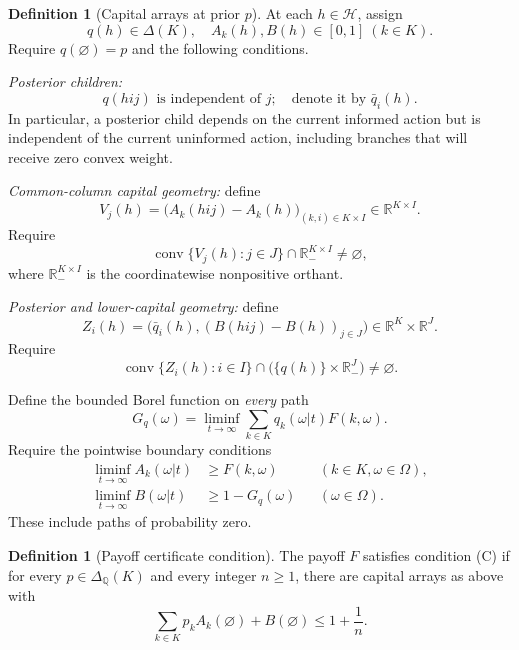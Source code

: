 \documentclass[11pt,a4paper]{article}
\theoremstyle{definition}
\newtheorem{definition}[theorem]{Definition}
\theoremstyle{remark}
\newcommand{\R}{\mathbb R}
\newcommand{\HH}{\mathcal H}
\newcommand{\co}{\operatorname{conv}}
\begin{document}
\begin{definition}[Capital arrays at prior $p$]
At each $h\in\HH$, assign
\[
 q(h)\in\Delta(K),\quad
 A_k(h),B(h)\in[0,1]\ (k\in K).
\]
Require $q(\varnothing)=p$ and the following conditions.

\emph{Posterior children:}
\begin{equation}
 q(hij)\text{ is independent of }j;
 \quad\text{denote it by }\bar q_i(h).
 \tag{BF}\label{bf}
\end{equation}
In particular, a posterior child depends on the current informed action
but is independent of the current uninformed action, including branches
that will receive zero convex weight.

\emph{Common-column capital geometry:} define
\[
 V_j(h)=\bigl(A_k(hij)-A_k(h)\bigr)_{(k,i)\in K\times I}
 \in\R^{K\times I}.
\]
Require
\begin{equation}
 \co\{V_j(h):j\in J\}\cap\R_{-}^{K\times I}\ne\varnothing,
 \tag{UC}\label{uc}
\end{equation}
where $\R_{-}^{K\times I}$ is the coordinatewise nonpositive orthant.

\emph{Posterior and lower-capital geometry:} define
\[
 Z_i(h)=\bigl(\bar q_i(h),
        (B(hij)-B(h))_{j\in J}\bigr)\in\R^K\times\R^J.
\]
Require
\begin{equation}
 \co\{Z_i(h):i\in I\}\cap
        \bigl(\{q(h)\}\times\R_-^J\bigr)\ne\varnothing.
 \tag{LC}\label{lc}
\end{equation}

Define the bounded Borel function on \emph{every} path
\begin{equation}
 G_q(\omega)=\liminf_{t\to\infty}
       \sum_{k\in K}q_k(\omega|t)F(k,\omega).
 \tag{G}\label{g}
\end{equation}
Require the pointwise boundary conditions
\begin{align}
 \liminf_{t\to\infty}A_k(\omega|t)&\geq F(k,\omega)
       &&(k\in K,\omega\in\Omega),\tag{UB}\label{ub}\\
 \liminf_{t\to\infty}B(\omega|t)&\geq1-G_q(\omega)
       &&(\omega\in\Omega).\tag{LB}\label{lb}
\end{align}
These include paths of probability zero.
\end{definition}

\begin{definition}[Payoff certificate condition]
The payoff $F$ satisfies condition \textup{(C)} if for every
$p\in\Delta_{\mathbb Q}(K)$ and every integer $n\geq1$, there are capital
arrays as above with
\begin{equation}
 \sum_{k\in K}p_k A_k(\varnothing)+B(\varnothing)\leq1+\frac1n.
 \tag{RC}\label{rc}
\end{equation}
\end{definition}
\end{document}
